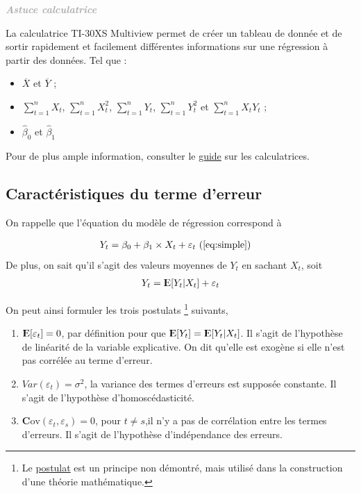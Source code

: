 \documentclass[11pt,french]{report}
\newcommand{\E}{{\rm I\kern-.3em E}}
\newcommand{\Cov}{\mathrm{\textbf{C}ov}}
\newenvironment{moreInfo}[1]
	{\begin{mdframed}
	\textcolor{darkgray}{\huge \raisebox{-3.5pt}{\faInfo} 
	\hspace{0.5cm} \large\bfseries #1}\\[5pt]
	\normalsize
	\makebox[0.1\textwidth][l]{}	
	\begin{minipage}{10cm}}
	{	\end{minipage}
	\end{mdframed}}
\begin{document}
\bigskip
\begin{moreInfo}{\color{Gray}\emph{Astuce calculatrice}}
     \color{black}
	La calculatrice TI-30XS Multiview permet de créer un tableau de donnée et de sortir rapidement et facilement différentes informations sur une régression à partir des données. Tel que :
	\begin{itemize}
	\item $\overline{X}$ et $\overline{Y}$ ;
	\item $\displaystyle\sum_{t=1}^n X_t$, $\displaystyle\sum_{t=1}^n X_t^2$, $\displaystyle\sum_{t=1}^n Y_t$, $\displaystyle\sum_{t=1}^n Y_t^2$ et $\displaystyle\sum_{t=1}^n X_tY_t$ ;
	\item $\hat{\beta}_0$ et $\hat{\beta}_1$
	\end{itemize}
	Pour de plus ample information, consulter le \href{https://github.com/alpa12/guide_calculatrice}{guide} sur les calculatrices.
\end{moreInfo}
\bigskip

\subsection{Caractéristiques du terme d'erreur}
On rappelle que l'équation du modèle de régression correspond à 

\begin{align*}
Y_t &= \beta_0 + \beta_1\times X_t + \varepsilon_t \text{ (\ref{eq:simple})}
\end{align*}
De plus, on sait qu'il s'agit des valeurs moyennes de $Y_t$ en sachant $X_t$, soit
\begin{align*}
Y_t = \E[Y_t|X_t] + \varepsilon_t 
\end{align*}

On peut ainsi formuler les trois postulats \footnote{Le \href{https://fr.wikipedia.org/wiki/Postulat}{postulat} est un principe non démontré, mais utilisé dans la construction d'une théorie mathématique. } suivants,
\begin{enumerate}
\item \label{post1} $\E[\varepsilon_t] = 0$, par définition pour que $\E[Y_t] = \E[Y_t|X_t]$. Il s'agit de l'hypothèse de linéarité de la variable explicative. On dit qu'elle est exogène si elle n'est pas corrélée au terme d'erreur.
\item \label{post2} $Var(\varepsilon_t) = \sigma^2$, la variance des termes d'erreurs est supposée constante. Il s'agit de l'hypothèse d'homoscédasticité.
\item \label{post3} $\Cov(\varepsilon_t, \varepsilon_s) = 0$, pour $t \neq s$,il n'y a pas de corrélation entre les termes d'erreurs. Il s'agit de l'hypothèse d'indépendance des erreurs.
\end{enumerate}
\end{document}
